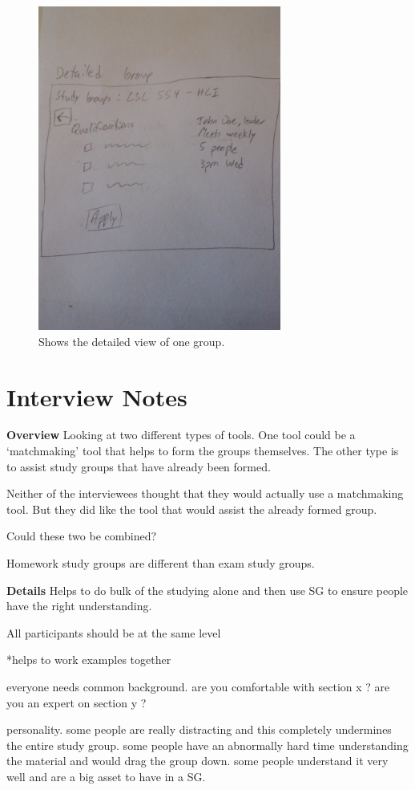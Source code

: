 \documentclass[conference]{IEEEtran}
\begin{document}
\begin{figure}[ht!]
\centering
\includegraphics[width=80mm]{figures/detailedGroup}
\caption{Shows the detailed view of one group. \label{fig:detailedGroup}}
\end{figure}


\section{Interview Notes}
\textbf{Overview}
Looking at two different types of tools. One tool could be a `matchmaking' tool that helps to form the groups themselves. The other type is to assist study groups that have already been formed.

Neither of the interviewees thought that they would actually use a matchmaking tool. But they did like the tool that would assist the already formed group.

Could these two be combined?

Homework study groups are different than exam study groups.

\textbf{Details}
Helps to do bulk of the studying alone and then use SG to ensure people have the right understanding.

All participants should be at the same level

*helps to work examples together

everyone needs common background.
  are you comfortable with section x ?
  are you an expert on section y ?

personality.
  some people are really distracting and this completely undermines the entire study group.
  some people have an abnormally hard time understanding the material and would drag the group down.
  some people understand it very well and are a big asset to have in a SG.
\end{document}
